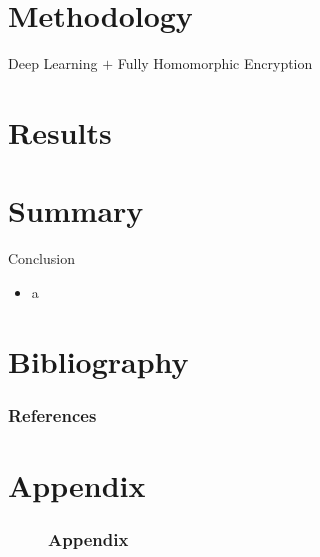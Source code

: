 \documentclass[aspectratio=169]{beamer}
\begin{document}
  \section{Methodology}

    \begin{frame}{Deep Learning $+$ Fully Homomorphic Encryption}

    \end{frame}

  \section{Results}

  \section{Summary}

    \begin{frame}{Conclusion}
      \begin{itemize}
        \item a
      \end{itemize}
    \end{frame}

  \section{Bibliography}

    \begin{frame}[allowframebreaks]
      \frametitle{References}
      
    \end{frame}

  \section{Appendix}

    \begin{figure}[allowframebreaks]
      \frametitle{Appendix}
    \end{figure}
\end{document}
